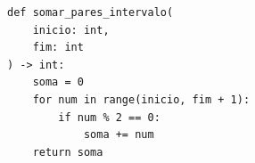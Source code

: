 \ifmostrarGabarito
\begin{verbatim}
def somar_pares_intervalo(
    inicio: int,
    fim: int
) -> int:
    soma = 0
    for num in range(inicio, fim + 1):
        if num % 2 == 0:
            soma += num
    return soma
\end{verbatim}

\fi
